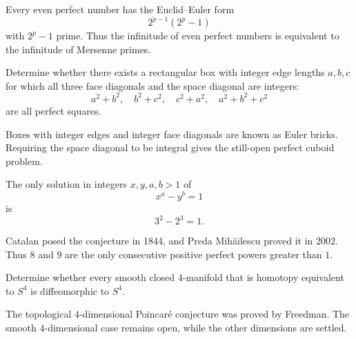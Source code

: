     \begin{remark}
        Every even perfect number has the Euclid--Euler form
        \[
            2^{p-1}(2^p-1)
        \]
        with $2^p-1$ prime. Thus the infinitude of even perfect numbers is
        equivalent to the infinitude of Mersenne primes.
    \end{remark}

    \begin{openproblem}
        Determine whether there exists a rectangular box with integer edge
        lengths $a,b,c$ for which all three face diagonals and the space
        diagonal are integers:
        \[
            a^2+b^2,\quad
            b^2+c^2,\quad
            c^2+a^2,\quad
            a^2+b^2+c^2
        \]
        are all perfect squares.
    \end{openproblem}

    \begin{remark}
        Boxes with integer edges and integer face diagonals are known as Euler
        bricks. Requiring the space diagonal to be integral gives the still-open
        perfect cuboid problem.
    \end{remark}

    \begin{theorem}
        The only solution in integers $x,y,a,b>1$ of
        \[
            x^a-y^b=1
        \]
        is
        \[
            3^2-2^3=1.
        \]
    \end{theorem}

    \begin{remark}
        Catalan posed the conjecture in 1844, and Preda Mihăilescu proved it in
        2002. Thus $8$ and $9$ are the only consecutive positive perfect powers
        greater than $1$.
    \end{remark}

    \begin{openproblem}
        Determine whether every smooth closed $4$-manifold that is homotopy
        equivalent to $S^4$ is diffeomorphic to $S^4$.
    \end{openproblem}

    \begin{remark}
        The topological $4$-dimensional Poincaré conjecture was proved by
        Freedman. The smooth $4$-dimensional case remains open, while the other
        dimensions are settled.
    \end{remark}

